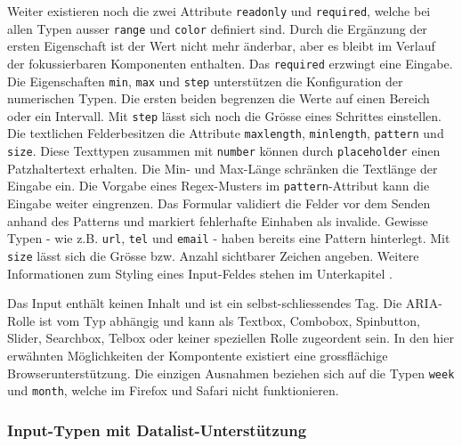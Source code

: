 Weiter existieren noch die zwei Attribute \texttt{readonly} und \texttt{required}, welche bei allen Typen ausser \texttt{range} und \texttt{color} definiert sind.
Durch die Ergänzung der ersten Eigenschaft ist der Wert nicht mehr änderbar, aber es bleibt im Verlauf der fokussierbaren Komponenten enthalten.
Das \texttt{required} erzwingt eine Eingabe.
Die Eigenschaften \texttt{min}, \texttt{max} und \texttt{step} unterstützen die Konfiguration der numerischen Typen\footnotemark.
Die ersten beiden begrenzen die Werte auf einen Bereich oder ein Intervall.
Mit \texttt{step} lässt sich noch die Grösse eines Schrittes einstellen.
Die textlichen Felder\footnotemark besitzen die Attribute \texttt{maxlength}, \texttt{minlength}, \texttt{pattern} und \texttt{size}.
Diese Texttypen zusammen mit \texttt{number} können durch \texttt{placeholder} einen Patzhaltertext erhalten.
Die Min- und Max-Länge schränken die Textlänge der Eingabe ein.
Die Vorgabe eines Regex-Musters im \texttt{pattern}-Attribut kann die Eingabe weiter eingrenzen.
Das Formular validiert die Felder vor dem Senden anhand des Patterns und markiert fehlerhafte Einhaben als invalide.
Gewisse Typen - wie z.B. \texttt{url}, \texttt{tel} und \texttt{email} - haben bereits eine Pattern hinterlegt.
Mit \texttt{size} lässt sich die Grösse bzw. Anzahl sichtbarer Zeichen angeben.
Weitere Informationen zum Styling eines Input-Feldes stehen im Unterkapitel \textbf{}.

Das Input enthält keinen Inhalt und ist ein selbst-schliessendes Tag.
Die ARIA-Rolle ist vom Typ abhängig und kann als Textbox, Combobox, Spinbutton, Slider, Searchbox, Telbox oder keiner speziellen Rolle zugeordent sein.
In den hier erwähnten Möglichkeiten der Kompontente existiert eine grossflächige Browserunterstützung.
Die einzigen Ausnahmen beziehen sich auf die Typen \texttt{week} und \texttt{month}, welche im Firefox und Safari nicht funktionieren.


\subsubsection{{\color{dgray} Input-Typen mit Datalist-Unterstützung}}
\label{sec:inutTypesDatalist}

